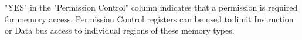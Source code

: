 \begin{tiplisting}
\vspace{-2em}
\begin{enumerate}
    "YES" in the "Permission Control" column indicates that a permission is required for memory access. Permission Control registers can be used to limit Instruction or Data bus access to individual regions of these memory types.
\end{enumerate}
\end{tiplisting}
